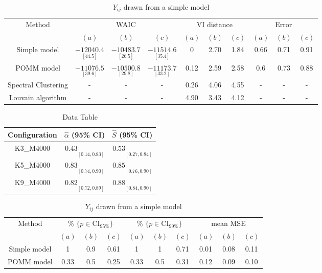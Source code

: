\documentclass[11pt]{amsart}
\begin{document}
\begin{table}[htbp]
\centering
\caption{$Y_{ij}$ drawn from a simple model}
\begin{tabular}{cccccccccc}
\toprule
\multirow{2}{*}{Method} & \multicolumn{3}{c}{WAIC} & \multicolumn{3}{c}{VI distance} & \multicolumn{3}{c}{Error} \\
\cmidrule(lr){2-4} \cmidrule(lr){5-7} \cmidrule(lr){8-10}
& $(a)$ & $(b)$ & $(c)$ & $(a)$ & $(b)$ & $(c)$ & $(a)$ & $(b)$ & $(c)$ \\
\midrule
Simple model &  $\underset{[44.5]}{-12040.4}$ & $\underset{[26.5]}{-10483.7}$ & $\underset{[35.4]}{-11514.6}$ & 0 & 2.70 & 1.84 & 0.66 & 0.71 & 0.91 \\
POMM model & $\underset{[39.6]}{-11076.5}$ & $\underset{[29.8]}{-10500.8}$& $\underset{[33.2]}{-11173.7}$ & 0.12 & 2.59 & 2.58 & 0.6 & 0.73 & 0.88  \\
Spectral Clustering & - & - & - & 0.26 & 4.06 & 4.55 & - & - & -  \\
Louvain algorithm & - & - & - & 4.90 & 3.43 & 4.12 & - & - & -  \\
\bottomrule
\end{tabular}
\label{table:simulations_from_simple}
\end{table}

\begin{table}[htbp]
  \centering
  \caption{Data Table}
  \label{tab:data}
  \begin{tabular}{ccc}
    \toprule
    Configuration & $\hat{\alpha}$ (95\% CI) & $\hat{S}$ (95\% CI) \\
    \midrule
    K3\_M4000 & $0.43 \underset{[0.14, 0.83]}{}$ & $0.53 \underset{[0.27, 0.84]}{}$ \\
    K5\_M4000 & $0.83 \underset{[0.74, 0.90]}{}$ & $0.85 \underset{[0.76, 0.90]}{}$ \\
    K9\_M4000 & $0.82 \underset{[0.72, 0.89]}{}$ & $0.88 \underset{[0.84, 0.90]}{}$ \\
    \bottomrule
  \end{tabular}
\end{table}




\begin{table}[htbp]
\centering
\caption{$Y_{ij}$ drawn from a simple model}
\begin{tabular}{cccccccccc}
\toprule
\multirow{2}{*}{Method} & \multicolumn{3}{c}{
\% $\{p \in \text{CI}_{95\%}\}$} & \multicolumn{3}{c}{
\% $\{p \in \text{CI}_{99\%}\}$} & \multicolumn{3}{c}{mean MSE} \\
\cmidrule(lr){2-4} \cmidrule(lr){5-7} \cmidrule(lr){8-10}
& $(a)$ & $(b)$ & $(c)$ & $(a)$ & $(b)$ & $(c)$ & $(a)$ & $(b)$ & $(c)$ \\
\midrule
Simple model & 1 &  0.9 & 0.61 & 1&1 & 0.71 & 0.01 & 0.08 & 0.11 \\
POMM model  &0.33&  0.5 & 0.25 & 0.33 & 0.5  & 0.31 & 0.12 & 0.09 & 0.10  \\
\bottomrule
\end{tabular}
\label{table:simulations_from_simple}
\end{table}
\clearpage
\end{document}
